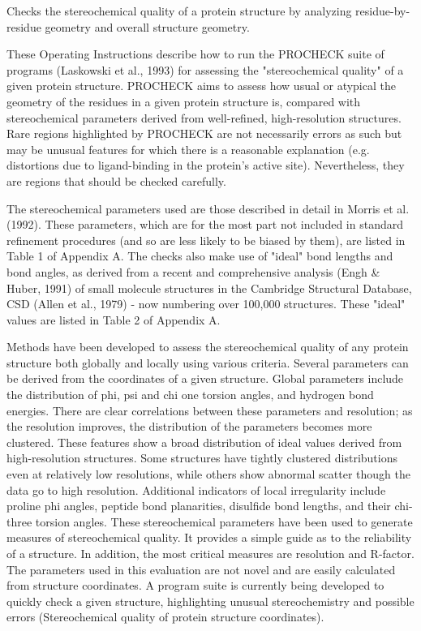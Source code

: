 \documentclass[11pt, letterpaper, english]{article}
\begin{document}
    \par{Checks the stereochemical quality of a protein structure by analyzing residue-by-residue geometry and overall structure geometry.}

    \par{These Operating Instructions describe how to run the PROCHECK suite of programs (Laskowski et al., 1993) for assessing the "stereochemical quality" of a given protein structure. PROCHECK aims to assess how usual or atypical the geometry of the residues in a given protein structure is,  compared with stereochemical parameters derived from well-refined, high-resolution structures. Rare regions highlighted by PROCHECK are not necessarily errors as such but may be unusual features for which there is a reasonable explanation (e.g. distortions due to ligand-binding in the protein's active site). Nevertheless, they are regions that should be checked carefully.}

    \par{The stereochemical parameters used are those described in detail in Morris et al. (1992). These parameters, which are for the most part not included in standard refinement procedures (and so are less likely to be biased by them), are listed in Table 1 of Appendix A. The checks also make use of "ideal" bond lengths and bond angles, as derived from a recent and comprehensive analysis (Engh \& Huber, 1991) of small molecule structures in the Cambridge Structural Database, CSD (Allen et al., 1979) - now numbering over 100,000 structures. These "ideal" values are listed in Table 2 of Appendix A.}

    \par{Methods have been developed to assess the stereochemical quality of any protein structure both globally and locally using various criteria. Several parameters can be derived from the coordinates of a given structure. Global parameters include the distribution of phi, psi and chi one torsion angles, and hydrogen bond energies. There are clear correlations between these parameters and resolution; as the resolution improves, the distribution of the parameters becomes more clustered. These features show a broad distribution of ideal values derived from high-resolution structures. Some structures have tightly clustered distributions even at relatively low resolutions, while others show abnormal scatter though the data go to high resolution. Additional indicators of local irregularity include proline phi angles, peptide bond planarities, disulfide bond lengths, and their chi-three torsion angles. These stereochemical parameters have been used to generate measures of stereochemical quality. It provides a simple guide as to the reliability of a structure. In addition, the most critical measures are resolution and R-factor. The parameters used in this evaluation are not novel and are easily calculated from structure coordinates. A program suite is currently being developed to quickly check a given structure, highlighting unusual stereochemistry and possible errors (Stereochemical quality of protein structure coordinates).}
\end{document}
